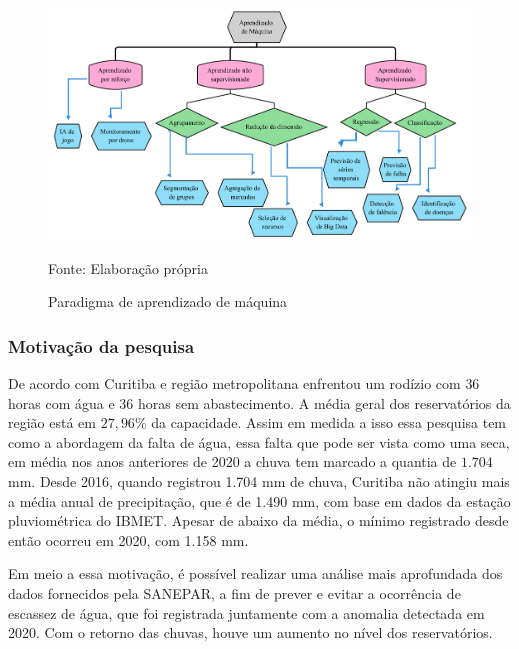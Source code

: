 \begin{figure}[H]
	\centering
	\caption{Paradigma de aprendizado de máquina}
	\includegraphics[width=1\linewidth]{Introducao/Figuras/paradigma-ml}
	
	Fonte: Elaboração própria
	\label{fig:paradigma-ml}
\end{figure}
  
      
\subsubsection{Motiva\c c\~ao da pesquisa} \label{subsubsec:motivacao}
    
    De acordo com \cite{vasconcelos_2020} Curitiba e região metropolitana enfrentou um rodízio com $36$ horas com água e $36$ horas sem abastecimento. A média geral dos reservatórios da região está em $27,96\%$ da capacidade. Assim em medida a isso essa pesquisa tem como a abordagem da falta de água, essa falta que pode ser vista como uma seca, em média nos anos anteriores de 2020 a chuva tem marcado a quantia de $1.704$ mm. \cite{vasconcelos_2020} Desde 2016, quando registrou 1.704 mm de chuva, Curitiba não atingiu mais a média anual de precipitação, que é de 1.490 mm, com base em dados da estação pluviométrica do IBMET.  Apesar de abaixo da média, o mínimo registrado desde então ocorreu em 2020, com 1.158 mm.
    
   Em meio a essa motivação, é possível realizar uma análise mais aprofundada dos dados fornecidos pela SANEPAR, a fim de prever e evitar a ocorrência de escassez de água, que foi registrada juntamente com a anomalia detectada em 2020. Com o retorno das chuvas, houve um aumento no nível dos reservatórios.
    
    